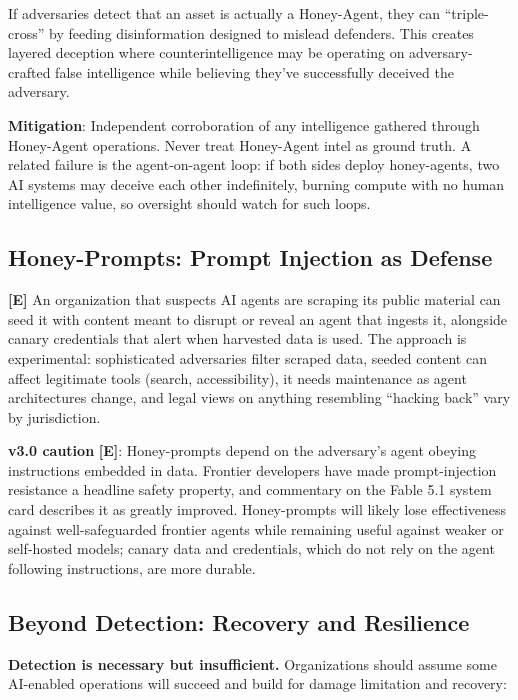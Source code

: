 \documentclass[11pt,letterpaper]{article}
\begin{document}
\begin{warnbox}
If adversaries detect that an asset is actually a Honey-Agent, they can ``triple-cross'' by feeding disinformation designed to mislead defenders. This creates layered deception where counterintelligence may be operating on adversary-crafted false intelligence while believing they've successfully deceived the adversary.

\textbf{Mitigation}: Independent corroboration of any intelligence gathered through Honey-Agent operations. Never treat Honey-Agent intel as ground truth. A related failure is the agent-on-agent loop: if both sides deploy honey-agents, two AI systems may deceive each other indefinitely, burning compute with no human intelligence value, so oversight should watch for such loops.
\end{warnbox}

\subsection{Honey-Prompts: Prompt Injection as Defense}

\textbf{[E]} An organization that suspects AI agents are scraping its public material can seed it with content meant to disrupt or reveal an agent that ingests it, alongside canary credentials that alert when harvested data is used. The approach is experimental: sophisticated adversaries filter scraped data, seeded content can affect legitimate tools (search, accessibility), it needs maintenance as agent architectures change, and legal views on anything resembling ``hacking back'' vary by jurisdiction.

\textbf{v3.0 caution} \textbf{[E]}: Honey-prompts depend on the adversary's agent obeying instructions embedded in data. Frontier developers have made prompt-injection resistance a headline safety property, and commentary on the Fable 5.1 system card describes it as greatly improved. Honey-prompts will likely lose effectiveness against well-safeguarded frontier agents while remaining useful against weaker or self-hosted models; canary data and credentials, which do not rely on the agent following instructions, are more durable.

\subsection{Beyond Detection: Recovery and Resilience}

\textbf{Detection is necessary but insufficient.} Organizations should assume some AI-enabled operations will succeed and build for damage limitation and recovery:
\end{document}

